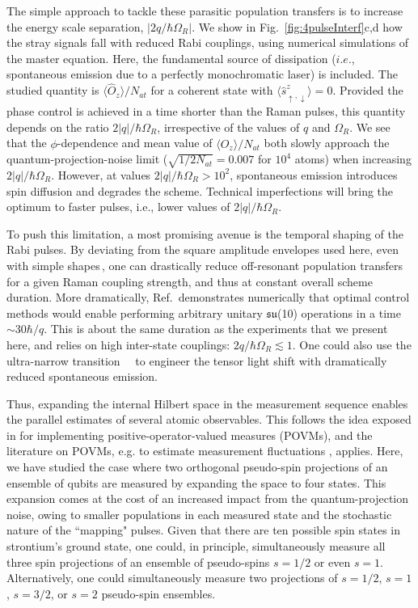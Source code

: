 The simple approach to tackle these parasitic population transfers is to increase the energy scale separation, $\left|  2 q / \hbar \Omega_R  \right|$. We show in Fig.~\ref{fig:4pulseInterf}c,d how the stray signals fall with reduced Rabi couplings, using numerical simulations of the master equation. Here, the fundamental source of dissipation ($i.e.$, spontaneous emission due to a perfectly monochromatic laser) is included. The studied quantity is $\langle \hat{O}_z \rangle / N_{at}$ for a coherent state with $\langle \hat{s}^z_{\uparrow, \downarrow} \rangle = 0$. Provided the phase control is achieved in a time shorter than the Raman pulses, this quantity depends on the ratio $ 2 |q| / \hbar \Omega_R$, irrespective of the values of $q$ and $\Omega_R$. We see that the $\phi$-dependence and mean value of $\langle \hat{O}_z \rangle / N_{at}$ both slowly approach the quantum-projection-noise limit ($\sqrt{ 1 /2 N_{at}}  = 0.007$ for $10^4$ atoms) when increasing $ 2 |q| / \hbar \Omega_R$. However, at values $ 2 |q| / \hbar \Omega_R > 10^2 $, spontaneous emission introduces spin diffusion and degrades the scheme. Technical imperfections will bring the optimum to faster pulses, i.e., lower values of $ 2 |q| / \hbar \Omega_R$.

To push this limitation, a most promising avenue is the temporal shaping of the Rabi pulses. By deviating from the square amplitude envelopes used here, even with simple shapes\,\cite{Leprince2024}, one can drastically reduce off-resonant population transfers for a given Raman coupling strength, and thus at constant overall scheme duration. More dramatically, Ref.\,\cite{Omanakuttan2021} demonstrates numerically that optimal control methods would enable performing arbitrary unitary $\mathfrak{su}$(10) operations in a time $\sim 30 \hbar / q$. This is about the same duration as the experiments that we present here, and relies on high inter-state couplings: $2 q / \hbar \Omega_R \lesssim 1$. One could also use the ultra-narrow transition \ThreePTwoTransition~\,\cite{Onishchenko2019} to engineer the tensor light shift with dramatically reduced spontaneous emission. 


Thus, expanding the internal Hilbert space in the measurement sequence enables the parallel estimates of several atomic observables. This follows the idea exposed in \cite{Peres1991} for implementing positive-operator-valued measures (POVMs), and the literature on POVMs, e.g. to estimate measurement fluctuations \cite{Massar2007}, applies. Here, we have studied the case where two orthogonal pseudo-spin projections of an ensemble of qubits are measured by expanding the space to four states. This expansion comes at the cost of an increased impact from the quantum-projection noise, owing to smaller populations in each measured state and the stochastic nature of the ``mapping" pulses. Given that there are ten possible spin states in strontium's ground state, one could, in principle, simultaneously measure all three spin projections of an ensemble of pseudo-spins $s=1/2$ or even $s=1$. Alternatively, one could simultaneously measure two projections of $s=1/2$, $s=1$, $s=3/2$, or $s=2$ pseudo-spin ensembles. 

